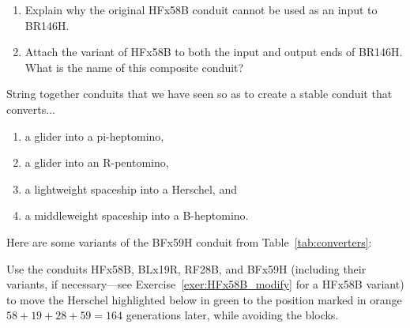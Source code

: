 \begin{multicols}{2}
\begin{problemstar}
		\begin{center}
			 \qquad {}
		\end{center}
		
		\begin{enumerate}[label=\bf\color{ocre}(\alph*)]
			\item Explain why the original HFx58B conduit cannot be used as an input to BR146H.
			
			\item Attach the variant of HFx58B to both the input and output ends of BR146H. What is the name of this composite conduit?
		\end{enumerate}
	\end{problemstar}


	\mfilbreak
	
	
	\begin{problem}\label{exer:composite_converters} 
		String together conduits that we have seen so as to create a stable conduit that converts...\smallskip
		
		\begin{enumerate}[label=\bf\color{ocre}(\alph*)]
			\item a glider into a pi-heptomino,
			
			\item a glider into an R-pentomino,
			
			\item a lightweight spaceship into a Herschel, and
			
			\item a middleweight spaceship into a B-heptomino.
		\end{enumerate}
	\end{problem}
	
	
	\clearpage%
	
	
	\begin{problemstar}\label{exer:herschel_variants} 
		Here are some variants of the BFx59H conduit from Table~\ref{tab:converters}:
		\begin{center}
		\end{center}
		Use the conduits HFx58B, BLx19R, RF28B, and BFx59H (including their variants, if necessary---see Exercise~\ref{exer:HFx58B_modify} for a HFx58B variant) to move the Herschel highlighted below in green to the position marked in orange $58+19+28+59=164$ generations later, while avoiding the blocks.	
		\begin{center}
		\end{center}
	\end{problemstar}
	

\end{multicols}
